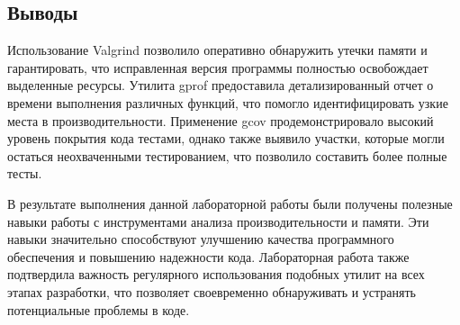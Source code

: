 \documentclass[12pt]{article}
\begin{document}
\subsection*{Выводы}

Использование Valgrind позволило оперативно обнаружить утечки памяти и гарантировать, что исправленная версия программы полностью освобождает выделенные ресурсы. Утилита gprof предоставила детализированный отчет о времени выполнения различных функций, что помогло идентифицировать узкие места в производительности. Применение gcov продемонстрировало высокий уровень покрытия кода тестами, однако также выявило участки, которые могли остаться неохваченными тестированием, что позволило составить более полные тесты.

В результате выполнения данной лабораторной работы были получены полезные навыки работы с инструментами анализа производительности и памяти. Эти навыки значительно способствуют улучшению качества программного обеспечения и повышению надежности кода. Лабораторная работа также подтвердила важность регулярного использования подобных утилит на всех этапах разработки, что позволяет своевременно обнаруживать и устранять потенциальные проблемы в коде.
\end{document}
